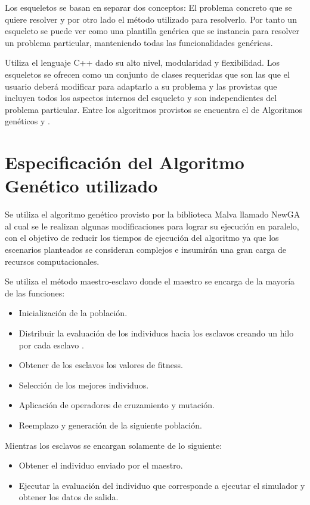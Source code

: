 Los esqueletos se basan en separar dos conceptos: El problema concreto que se quiere resolver y por otro lado el método utilizado para resolverlo. Por tanto un esqueleto se puede ver como una plantilla genérica que se instancia para resolver un problema particular, manteniendo todas las funcionalidades genéricas.

Utiliza el lenguaje C++ dado su alto nivel, modularidad y flexibilidad. Los esqueletos se ofrecen como un conjunto de clases requeridas que son las que el usuario deberá modificar para adaptarlo a su problema y las provistas que incluyen todos los aspectos internos del esqueleto y son independientes del problema particular. Entre los algoritmos provistos se encuentra el de Algoritmos genéticos y \citet{CHC}.





\section{Especificación del Algoritmo Genético utilizado}
Se utiliza el algoritmo genético provisto por la biblioteca  Malva  llamado NewGA al cual se le realizan algunas modificaciones para lograr su ejecución en paralelo, con el objetivo de reducir los tiempos de ejecución del algoritmo ya que los escenarios planteados se consideran complejos e insumirán una gran carga de recursos computacionales.

Se utiliza el método maestro-esclavo donde el maestro se encarga de la mayoría de las funciones:

\begin{itemize}
\item Inicialización de la población.
\item Distribuir la evaluación de los individuos hacia los esclavos creando un hilo por cada esclavo	.
\item Obtener de los esclavos los valores de fitness.
\item Selección de los mejores individuos.
\item Aplicación de operadores de cruzamiento y mutación.
\item Reemplazo y generación de la siguiente población.
\end{itemize}

Mientras los esclavos se encargan solamente de lo siguiente:
\begin{itemize}
	\item Obtener el individuo enviado por el maestro.
	\item Ejecutar la evaluación del individuo que corresponde a ejecutar el simulador y obtener los datos de salida.
\end{itemize}


